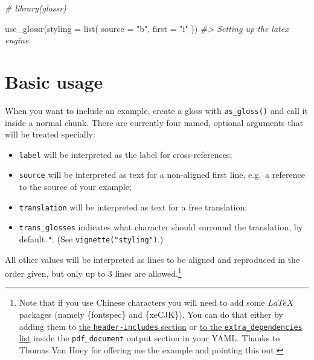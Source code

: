\documentclass[
]{article}
\newenvironment{Shaded}{\begin{snugshade}}{\end{snugshade}}
\newcommand{\AttributeTok}[1]{\textcolor[rgb]{0.77,0.63,0.00}{#1}}
\newcommand{\CommentTok}[1]{\textcolor[rgb]{0.56,0.35,0.01}{\textit{#1}}}
\newcommand{\FunctionTok}[1]{\textcolor[rgb]{0.00,0.00,0.00}{#1}}
\newcommand{\NormalTok}[1]{#1}
\newcommand{\StringTok}[1]{\textcolor[rgb]{0.31,0.60,0.02}{#1}}
\begin{document}
\begin{Shaded}
\begin{Highlighting}[]
\CommentTok{\# library(glossr)}
\end{Highlighting}
\end{Shaded}

\begin{Shaded}
\begin{Highlighting}[]
\FunctionTok{use\_glossr}\NormalTok{(}\AttributeTok{styling =} \FunctionTok{list}\NormalTok{(}
  \AttributeTok{source =} \StringTok{"b"}\NormalTok{,}
  \AttributeTok{first =} \StringTok{"i"}
\NormalTok{))}
\CommentTok{\#\textgreater{} Setting up the \textasciigrave{}latex\textasciigrave{} engine.}
\end{Highlighting}
\end{Shaded}

\hypertarget{basic-usage}{%
\section{Basic usage}\label{basic-usage}}

When you want to include an example, create a gloss with \texttt{as\_gloss()} and call it inside a normal chunk. There are currently four named, optional arguments that will be treated specially:

\begin{itemize}
\item
  \texttt{label} will be interpreted as the label for cross-references;
\item
  \texttt{source} will be interpreted as text for a non-aligned first line, e.g.~a reference to the source of your example;
\item
  \texttt{translation} will be interpreted as text for a free translation;
\item
  \texttt{trans\_glosses} indicates what character should surround the translation, by default \texttt{"}. (See \texttt{vignette("styling")}.)
\end{itemize}

All other values will be interpreted as lines to be aligned and reproduced in the order given, but only up to 3 lines are allowed.\footnote{Note that if you use Chinese characters you will need to add some \(LaTeX\) packages (namely \{fontspec\} and \{xeCJK\}). You can do that either by adding them to \href{https://bookdown.org/yihui/rmarkdown-cookbook/latex-preamble.html}{the \texttt{header-includes} section} or \href{https://bookdown.org/yihui/rmarkdown-cookbook/latex-extra.html}{to the \texttt{extra\_dependencies} list} inside the \texttt{pdf\_document} output section in your YAML. Thanks to Thomas Van Hoey for offering me the example and pointing this out.}
\end{document}
